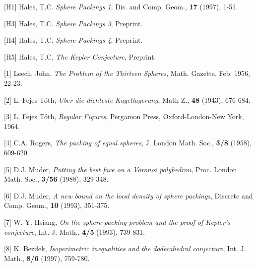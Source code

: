 [H1] Hales, T.C. {\it Sphere Packings 1}, Dis. and Comp. Geom., 
{\bf 17} (1997), 1-51.

[H3] Hales, T.C. {\it Sphere Packings 3}, Preprint.

[H4] Hales, T.C. {\it Sphere Packings 4}, Preprint.

[H5] Hales, T.C. {\it The Kepler Conjecture}, Preprint.

[1] Leech, John.  {\it The Problem of the Thirteen Spheres},  Math. Gazette,  
Feb. 1956, 22-23.

[2] L. Fejes T\'oth, {\it Uber die dichteste Kugellagerung}, Math 
Z., {\bf 48} (1943), 676-684.

[3] L. Fejes T\'oth, {\it Regular Figures}, Pergamon Press, Oxford-London-New York, 1964.


[4] C.A. Rogers, {\it The packing of equal spheres}, J. London Math. Soc.,
{\bf 3/8} (1958), 609-620.

[5] D.J. Muder, {\it Putting the best face on a Voronoi polyhedron}, 
Proc. London Math. Soc., {\bf 3/56} (1988), 329-348.

[6] D.J. Muder, {\it A new bound on the local density of sphere packings}, 
Discrete and Comp. Geom., {\bf 10} (1993), 351-375.

[7] W.-Y. Hsiang, {\it On the sphere packing problem and the proof of Kepler's conjecture},
Int. J. Math., {\bf 4/5} (1993), 739-831.

[8] K. Bezdek, {\it Isoperimetric inequalities and the dodecahedral conjecture}, Int. J. Math.,
{\bf 8/6} (1997), 759-780.

\bye
